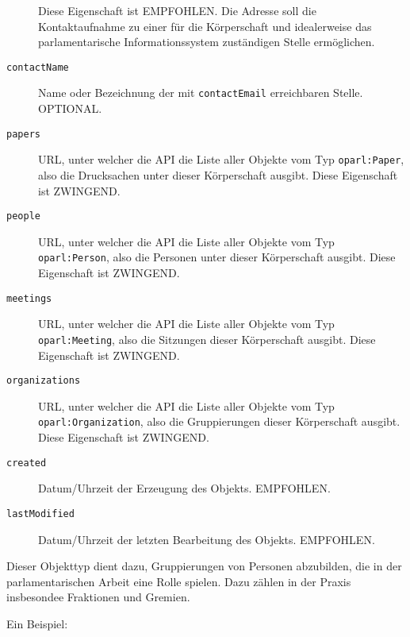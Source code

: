 \documentclass[,a4paper]{article}
\begin{document}
\begin{description}
Diese Eigenschaft ist EMPFOHLEN. Die Adresse soll die Kontaktaufnahme zu
einer für die Körperschaft und idealerweise das parlamentarische
Informationssystem zuständigen Stelle ermöglichen.
\item[\texttt{contactName}]
Name oder Bezeichnung der mit \texttt{contactEmail} erreichbaren Stelle.
OPTIONAL.
\item[\texttt{papers}]
URL, unter welcher die API die Liste aller Objekte vom Typ
\texttt{oparl:Paper}, also die Drucksachen unter dieser Körperschaft
ausgibt. Diese Eigenschaft ist ZWINGEND.
\item[\texttt{people}]
URL, unter welcher die API die Liste aller Objekte vom Typ
\texttt{oparl:Person}, also die Personen unter dieser Körperschaft
ausgibt. Diese Eigenschaft ist ZWINGEND.
\item[\texttt{meetings}]
URL, unter welcher die API die Liste aller Objekte vom Typ
\texttt{oparl:Meeting}, also die Sitzungen dieser Körperschaft ausgibt.
Diese Eigenschaft ist ZWINGEND.
\item[\texttt{organizations}]
URL, unter welcher die API die Liste aller Objekte vom Typ
\texttt{oparl:Organization}, also die Gruppierungen dieser Körperschaft
ausgibt. Diese Eigenschaft ist ZWINGEND.
\item[\texttt{created}]
Datum/Uhrzeit der Erzeugung des Objekts. EMPFOHLEN.
\item[\texttt{lastModified}]
Datum/Uhrzeit der letzten Bearbeitung des Objekts. EMPFOHLEN.
\end{description}


Dieser Objekttyp dient dazu, Gruppierungen von Personen abzubilden, die
in der parlamentarischen Arbeit eine Rolle spielen. Dazu zählen in der
Praxis insbesondee Fraktionen und Gremien.

Ein Beispiel:
\end{document}
